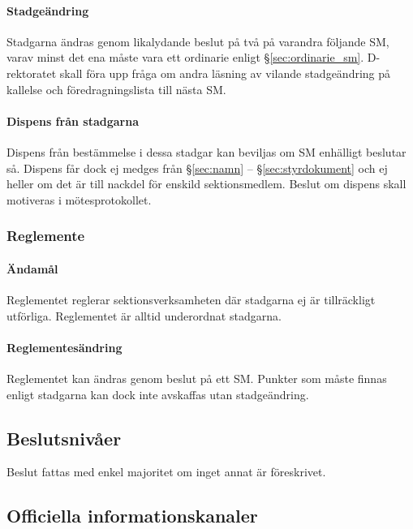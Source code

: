 \documentclass{dgovdoc}
\begin{document}
\paragraph{Stadgeändring}

Stadgarna ändras genom likalydande beslut på två på varandra följande SM, varav
minst det ena måste vara ett ordinarie enligt \S\ref{sec:ordinarie_sm}.
D-rektoratet skall föra upp fråga om andra läsning av vilande stadgeändring på
kallelse och föredragningslista till nästa SM.

\paragraph{Dispens från stadgarna}

Dispens från bestämmelse i dessa stadgar kan beviljas om SM enhälligt beslutar
så. Dispens får dock ej medges från \S\ref{sec:namn} -- \S\ref{sec:styrdokument}
och ej heller om det är till nackdel för enskild sektionsmedlem. Beslut om
dispens skall motiveras i mötesprotokollet.

\subsubsection{Reglemente}

\paragraph{Ändamål}

Reglementet reglerar sektionsverksamheten där stadgarna ej är tillräckligt
utförliga. Reglementet är alltid underordnat stadgarna.

\paragraph{Reglementesändring}

Reglementet kan ändras genom beslut på ett SM. Punkter som måste finnas enligt
stadgarna kan dock inte avskaffas utan stadgeändring.

\subsection{Beslutsnivåer}

Beslut fattas med enkel majoritet om inget annat är föreskrivet.

\subsection{Officiella informationskanaler}
\label{sec:officiella_informationskanaler}
\end{document}

